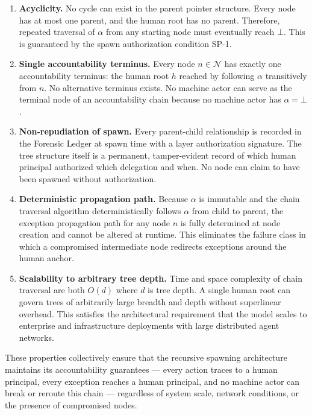 \begin{enumerate}
\item[$\mathbf{P_1}$] \textbf{Acyclicity.} No cycle can exist in the parent pointer structure. Every node has at most one parent, and the human root has no parent. Therefore, repeated traversal of $\alpha$ from any starting node must eventually reach $\bot$. This is guaranteed by the spawn authorization condition SP-1.

\item[$\mathbf{P_2}$] \textbf{Single accountability terminus.} Every node $n \in \mathcal{N}$ has exactly one accountability terminus: the human root $h$ reached by following $\alpha$ transitively from $n$. No alternative terminus exists. No machine actor can serve as the terminal node of an accountability chain because no machine actor has $\alpha = \bot$.

\item[$\mathbf{P_3}$] \textbf{Non-repudiation of spawn.} Every parent-child relationship is recorded in the Forensic Ledger at spawn time with a \purpose{} layer authorization signature. The tree structure itself is a permanent, tamper-evident record of which human principal authorized which delegation and when. No node can claim to have been spawned without authorization.

\item[$\mathbf{P_4}$] \textbf{Deterministic propagation path.} Because $\alpha$ is immutable and the chain traversal algorithm deterministically follows $\alpha$ from child to parent, the exception propagation path for any node $n$ is fully determined at node creation and cannot be altered at runtime. This eliminates the failure class in which a compromised intermediate node redirects exceptions around the human anchor.

\item[$\mathbf{P_5}$] \textbf{Scalability to arbitrary tree depth.} Time and space complexity of chain traversal are both $O(d)$ where $d$ is tree depth. A single human root can govern trees of arbitrarily large breadth and depth without superlinear overhead. This satisfies the architectural requirement that the \bxthree{} model scales to enterprise and infrastructure deployments with large distributed agent networks.
\end{enumerate}

These properties collectively ensure that the \bxthree{} recursive spawning architecture maintains its accountability guarantees — every action traces to a human principal, every exception reaches a human principal, and no machine actor can break or reroute this chain — regardless of system scale, network conditions, or the presence of compromised nodes.